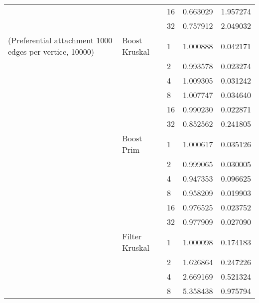 \begin{tabular}{lllrr}
                                                       &                     & 16 &  0.663029 &  1.957274 \\
                                                       &                     & 32 &  0.757912 &  2.049032 \\
(Preferential attachment 1000 edges per vertice, 10000) & Boost Kruskal & 1  &  1.000888 &  0.042171 \\
                                                       &                     & 2  &  0.993578 &  0.023274 \\
                                                       &                     & 4  &  1.009305 &  0.031242 \\
                                                       &                     & 8  &  1.007747 &  0.034640 \\
                                                       &                     & 16 &  0.990230 &  0.022871 \\
                                                       &                     & 32 &  0.852562 &  0.241805 \\
                                                       & Boost Prim & 1  &  1.000617 &  0.035126 \\
                                                       &                     & 2  &  0.999065 &  0.030005 \\
                                                       &                     & 4  &  0.947353 &  0.096625 \\
                                                       &                     & 8  &  0.958209 &  0.019903 \\
                                                       &                     & 16 &  0.976525 &  0.023752 \\
                                                       &                     & 32 &  0.977909 &  0.027090 \\
                                                       & Filter Kruskal & 1  &  1.000098 &  0.174183 \\
                                                       &                     & 2  &  1.626864 &  0.247226 \\
                                                       &                     & 4  &  2.669169 &  0.521324 \\
                                                       &                     & 8  &  5.358438 &  0.975794 \\

\end{tabular}
